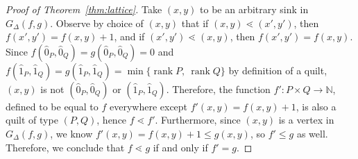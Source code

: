 \documentclass[10pt,a4paper]{amsart}
\newcommand{\N}{{\mathbb N}}
\newcommand{\longto}{\longrightarrow}
\newcommand{\rank}{\operatorname{rank}}
\begin{document}
\begin{proof}[Proof of Theorem~\ref{thm:lattice}]
Take $(x,y)$ to be an arbitrary sink in $G_\Delta(f,g)$.  Observe by
choice of $(x,y)$ that if $(x,y) \lessdot (x',y')$, then $f(x',y') =
f(x,y) + 1$, and if $(x',y') \lessdot (x,y)$, then $f(x',y') =
f(x,y)$. Since $f(\hat 0_{P},\hat 0_{Q})=g(\hat 0_{P},\hat 0_{Q})=0$
and $f(\hat 1_{P},\hat 1_{Q})=g(\hat 1_{P},\hat 1_{Q})=\min\{\rank P,\
\rank Q\}$ by definition of a quilt, $(x,y)$ is not $(\hat 0_{P},\hat
0_{Q})$ or $(\hat 1_{P},\hat 1_{Q})$.  Therefore, the function $f'
\colon P \times Q \longto \N$, defined to be equal to $f$ everywhere
except $f'(x,y)=f(x,y)+1$, is also a quilt of type $(P,Q)$, hence
$f\lessdot f'$.  Furthermore, since $(x,y)$ is a vertex in
$G_\Delta(f,g)$, we know $f'(x,y)=f(x,y)+1\leq g(x,y)$, so $f'\leq g$
as well. Therefore, we conclude that $f \lessdot g$ if and only if
$f'=g$.
\end{proof}
\end{document}
